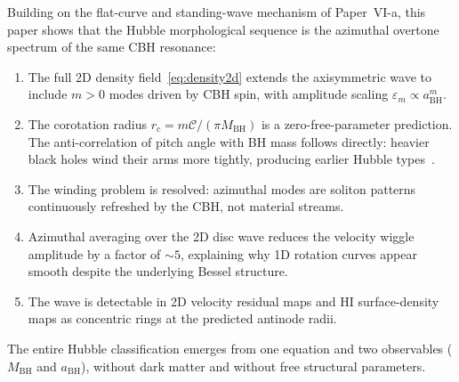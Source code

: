 \documentclass[11pt,a4paper]{article}
\begin{document}
Building on the flat-curve and standing-wave mechanism of Paper~VI-a, this paper shows that
the Hubble morphological sequence is the azimuthal overtone spectrum of the same CBH
resonance:

\begin{enumerate}
  \item The full 2D density field~\eqref{eq:density2d} extends the axisymmetric wave to
    include $m>0$ modes driven by CBH spin, with amplitude scaling
    $\varepsilon_m \propto a_\mathrm{BH}^m$.

  \item The corotation radius $r_c = m\mathcal{C}/(\pi M_\mathrm{BH})$ is a
    zero-free-parameter prediction.  The anti-correlation of pitch angle with BH mass
    follows directly: heavier black holes wind their arms more tightly, producing earlier
    Hubble types~\cite{seigar2008}.

  \item The winding problem is resolved: azimuthal modes are soliton patterns
    continuously refreshed by the CBH, not material streams.

  \item Azimuthal averaging over the 2D disc wave reduces the velocity wiggle amplitude
    by a factor of $\sim5$, explaining why 1D rotation curves appear smooth despite the
    underlying Bessel structure.

  \item The wave is detectable in 2D velocity residual maps and HI surface-density maps as
    concentric rings at the predicted antinode radii.
\end{enumerate}

The entire Hubble classification emerges from one equation and two observables
($M_\mathrm{BH}$ and $a_\mathrm{BH}$), without dark matter and without free structural
parameters.
\end{document}
